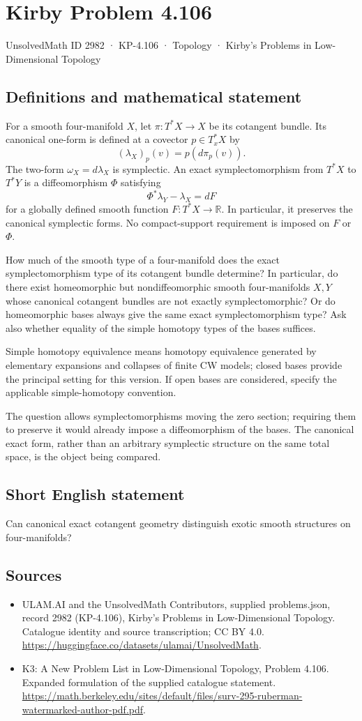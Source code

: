 \documentclass[11pt,a4paper]{article}
\begin{document}
\section*{Kirby Problem 4.106}\label{2982}
{\small UnsolvedMath ID 2982 · KP-4.106 · Topology · Kirby's Problems in Low-Dimensional Topology}
\subsection{Definitions and mathematical statement}
For a smooth four-manifold $X$, let $\pi:T^*X\to X$ be its cotangent bundle. Its canonical one-form is defined at a covector $p\in T_x^*X$ by
\[
(\lambda_X)_p(v)=p(d\pi_p(v)).
\]
The two-form $\omega_X=d\lambda_X$ is symplectic. An exact symplectomorphism from $T^*X$ to $T^*Y$ is a diffeomorphism $\Phi$ satisfying
\[
\Phi^*\lambda_Y-\lambda_X=dF
\]
for a globally defined smooth function $F:T^*X\to\mathbb R$. In particular, it preserves the canonical symplectic forms. No compact-support requirement is imposed on $F$ or $\Phi$.

How much of the smooth type of a four-manifold does the exact symplectomorphism type of its cotangent bundle determine? In particular, do there exist homeomorphic but nondiffeomorphic smooth four-manifolds $X,Y$ whose canonical cotangent bundles are not exactly symplectomorphic? Or do homeomorphic bases always give the same exact symplectomorphism type? Ask also whether equality of the simple homotopy types of the bases suffices.

Simple homotopy equivalence means homotopy equivalence generated by elementary expansions and collapses of finite CW models; closed bases provide the principal setting for this version. If open bases are considered, specify the applicable simple-homotopy convention.

The question allows symplectomorphisms moving the zero section; requiring them to preserve it would already impose a diffeomorphism of the bases. The canonical exact form, rather than an arbitrary symplectic structure on the same total space, is the object being compared.
\subsection{Short English statement}
Can canonical exact cotangent geometry distinguish exotic smooth structures on four-manifolds?
\subsection{Sources}
\begin{itemize}
\item[S1] ULAM.AI and the UnsolvedMath Contributors, supplied problems.json, record 2982 (KP-4.106), Kirby's Problems in Low-Dimensional Topology. Catalogue identity and source transcription; CC BY 4.0.
\url{https://huggingface.co/datasets/ulamai/UnsolvedMath}.
\item[S2] K3: A New Problem List in Low-Dimensional Topology, Problem 4.106. Expanded formulation of the supplied catalogue statement.
\url{https://math.berkeley.edu/sites/default/files/surv-295-ruberman-watermarked-author-pdf.pdf}.
\end{itemize}
\end{document}
